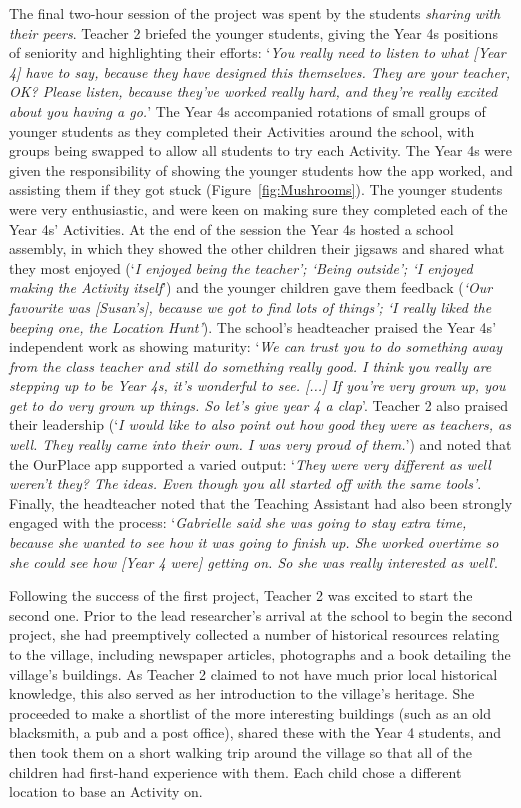 \documentclass[,hyphens]{sigchi}
\begin{document}
The final two-hour session of the project was spent by the students \textit{sharing with their peers}. Teacher 2 briefed the younger students, giving the Year 4s positions of seniority and highlighting their efforts: `\textit{You really need to listen to what [Year 4] have to say, because they have designed this themselves. They are your teacher, OK? Please listen, because they've worked really hard, and they're really excited about you having a go.}' The Year 4s accompanied rotations of small groups of younger students as they completed their Activities around the school, with groups being swapped to allow all students to try each Activity. The Year 4s were given the responsibility of showing the younger students how the app worked, and assisting them if they got stuck (Figure~\ref{fig:Mushrooms}). The younger students were very enthusiastic, and were keen on making sure they completed each of the Year 4s' Activities. At the end of the session the Year 4s hosted a school assembly, in which they showed the other children their jigsaws and shared what they most enjoyed (`\textit{I enjoyed being the teacher'; `Being outside'; `I enjoyed making the Activity itself}') and the younger children gave them feedback (\textit{`Our favourite was [Susan's], because we got to find lots of things'; `I really liked the beeping one, the Location Hunt'}). The school's headteacher praised the Year 4s' independent work as showing maturity: `\textit{We can trust you to do something away from the class teacher and still do something really good. I think you really are stepping up to be Year 4s, it's wonderful to see. [...] If you're very grown up, you get to do very grown up things. So let's give year 4 a clap}'. Teacher 2 also praised their leadership (`\textit{I would like to also point out how good they were as teachers, as well. They really came into their own. I was very proud of them.}') and noted that the OurPlace app supported a varied output: `\textit{They were very different as well weren't they? The ideas. Even though you all started off with the same tools'}. Finally, the headteacher noted that the Teaching Assistant had also been strongly engaged with the process: `\textit{Gabrielle said she was going to stay extra time, because she wanted to see how it was going to finish up. She worked overtime so she could see how [Year 4 were] getting on. So she was really interested as well}'.

Following the success of the first project, Teacher 2 was excited to start the second one. Prior to the lead researcher's arrival at the school to begin the second project, she had preemptively collected a number of historical resources relating to the village, including newspaper articles, photographs and a book detailing the village's buildings. As Teacher 2 claimed to not have much prior local historical knowledge, this also served as her introduction to the village's heritage. She proceeded to make a shortlist of the more interesting buildings (such as an old blacksmith, a pub and a post office), shared these with the Year 4 students, and then took them on a short walking trip around the village so that all of the children had first-hand experience with them. Each child chose a different location to base an Activity on.
\end{document}
